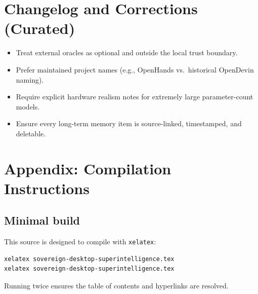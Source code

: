 \documentclass[11pt]{article}
\begin{document}
\section{Changelog and Corrections (Curated)}

\begin{itemize}
  \item Treat external oracles as optional and outside the local trust boundary.
  \item Prefer maintained project names (e.g., OpenHands vs.\ historical OpenDevin naming).
  \item Require explicit hardware realism notes for extremely large parameter-count models.
  \item Ensure every long-term memory item is source-linked, timestamped, and deletable.
\end{itemize}

\section{Appendix: Compilation Instructions}

\subsection{Minimal build}

This source is designed to compile with \texttt{xelatex}:

\begin{lstlisting}[basicstyle=\ttfamily\small,frame=single]
xelatex sovereign-desktop-superintelligence.tex
xelatex sovereign-desktop-superintelligence.tex
\end{lstlisting}

Running twice ensures the table of contents and hyperlinks are resolved.
\end{document}
